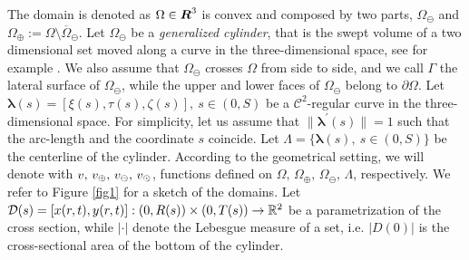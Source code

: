 \documentclass[r]{siamart171218}
\begin{document}
The domain is denoted as $\Omega\in \boldsymbol R^3 $ is convex and composed by two parts, 
$\Omega_{\ominus}$ and $\Omega_{\oplus}:=\Omega\setminus\overline{\Omega}_{\ominus}$. 
Let $\Omega_{\ominus}$ be a \emph{generalized cylinder}, 
that is the swept volume of a two dimensional set moved along a curve in the three-dimensional space, see for example \cite{MR1940257}.
We also assume that $\Omega_{\ominus}$ crosses $\Omega$ from side to side, and we call $\Gamma$ the lateral surface of $\Omega_{\ominus}$, 
while the upper and lower faces of $\Omega_{\ominus}$ belong to $\partial\Omega$. 
Let $\boldsymbol \lambda(s) = [\xi(s), \tau(s), \zeta(s)], \ s\in(0,S)$ be a $\mathcal{C}^2$-regular curve in the three-dimensional space.
For simplicity, let us assume that $\|\boldsymbol \lambda^\prime(s)\|=1$ such that the arc-length and the coordinate $s$ coincide.
Let $\Lambda = \{\boldsymbol \lambda(s), \ s\in(0,S)\}$ be the centerline of the cylinder. 
According to the geometrical setting, we will denote with $v,\,v_\oplus,\,v_\ominus,\,v_{\odot}$,
functions defined on $\Omega,\,\Omega_{\oplus},\,\Omega_{\ominus},\,\Lambda$, respectively.
We refer to Figure \ref{fig1} for a sketch of the domains.
Let $\mathcal{D}(s) = [x(r,t),y(r,t)]: (0,R(s))\times(0,T(s)) \rightarrow \mathbb{R}^2$ be a parametrization of the cross section, while 
$|\cdot|$ denote the Lebesgue measure of a set, i.e. $|D(0)|$ is the cross-sectional area of the bottom of the cylinder. 



\end{document}
